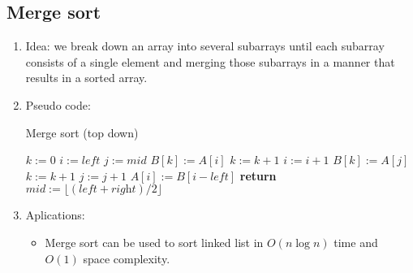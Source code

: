 \documentclass[12pt]{article}
\begin{document}
    \subsection{Merge sort}
    \begin{enumerate}
        \item Idea: we break down an array into several subarrays until each subarray consists of a single element and merging those subarrays in a manner that results in a sorted array.
        \item Pseudo code:
        \begin{algorithm}[H]
            \caption{Merge sort (top down)}
            \begin{algorithmic}[1]
                    \State $k:=0$
                    \State $i:=\textit{left}$
                    \State $j:=\textit{mid}$
                            \State $B[k]:=A[i]$
                            \State $k:=k+1$
                            \State $i:=i+1$
                        \Else
                            \State $B[k]:=A[j]$
                            \State $k:=k+1$
                            \State $j:=j+1$
                        \EndIf
                    \EndFor
                        \State $A[i]:=B[i-\textit{left}]$
                    \EndFor
                \EndFunction
                \State
                        \State \textbf{return}
                    \EndIf
                    \State $\textit{mid}:=\lfloor (\textit{left}+\textit{right})/2\rfloor$
                    \State {}
                    \State {}
                    \State {}
                \EndFunction
            \end{algorithmic}
        \end{algorithm}
        \item Aplications:
        \begin{itemize}
            \item Merge sort can be used to sort linked list in $O(n\log n)$ time and $O(1)$ space complexity.

\end{itemize}
\end{enumerate}
\end{document}
